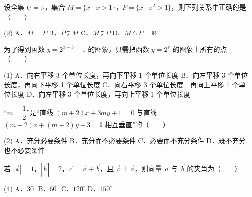 

\begin{question}
设全集 $U = \mathbb{R}$，集合 $M = \{x \mid x > 1\}$，$P = \{x \mid x^2 > 1\}$，则下列关系中正确的是\mbox{（　　）}

\begin{gkopts}(2)
\task A．$M = P$
\task B．$P \subsetneqq M$
\task C．$M \subsetneqq P$
\task D．$M \cap P = \mathbb{R}$
\end{gkopts}

\end{question}
\begin{question}
为了得到函数 $y = 2^{x-3} - 1$ 的图象，只需把函数 $y = 2^x$ 的图象上所有的点\mbox{（　　）}

\begin{gkopts}(1)
\task A．向右平移 3 个单位长度，再向下平移 1 个单位长度
\task B．向左平移 3 个单位长度，再向下平移 1 个单位长度
\task C．向右平移 3 个单位长度，再向上平移 1 个单位长度
\task D．向左平移 3 个单位长度，再向上平移 1 个单位长度
\end{gkopts}

\end{question}
\begin{question}
“$m = \dfrac{1}{2}$”是“直线 $(m+2)x + 3my + 1 = 0$ 与直线 $(m-2)x + (m+2)y - 3 = 0$ 相互垂直”的\mbox{（　　）}

\begin{gkopts}(2)
\task A．充分必要条件
\task B．充分而不必要条件
\task C．必要而不充分条件
\task D．既不充分也不必要条件
\end{gkopts}

\end{question}
\begin{question}
若 $|\vec{a}| = 1$，$|\vec{b}| = 2$，$\vec{c} = \vec{a} + \vec{b}$，且 $\vec{c} \perp \vec{a}$，则向量 $\vec{a}$ 与 $\vec{b}$ 的夹角为\mbox{（　　）}

\begin{gkopts}(4)
\task A．$30^\circ$
\task B．$60^\circ$
\task C．$120^\circ$
\task D．$150^\circ$
\end{gkopts}

\end{question}
